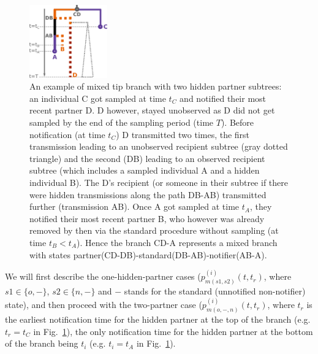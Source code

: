 \documentclass[a4paper,10pt]{article}
\begin{document}
\begin{figure}[tbhp]
\centering 
\includegraphics[width=0.3\textwidth]{Fig_mixed}
\caption{An example of mixed tip branch with two hidden partner subtrees: an individual C got sampled at time $t_C$ and notified their most recent partner D. D however, stayed unobserved as D did not get sampled by the end of the sampling period (time $T$). Before notification (at time $t_C$) D transmitted two times, the first transmission leading to an unobserved recipient subtree (gray dotted triangle) and the second (DB) leading to an observed recipient subtree (which includes a sampled individual A and a hidden individual B). The D's recipient (or someone in their subtree if there were hidden transmissions along the path DB-AB) transmitted further (transmission AB). Once A got sampled at time $t_A$, they notified their most recent partner B, who however was already removed by then via the standard procedure without sampling (at time $t_B < t_A$). Hence the branch CD-A represents a mixed branch with states partner(CD-DB)-standard(DB-AB)-notifier(AB-A). }
\label{fig:pn-mixed} 
\end{figure}


We will first describe the one-hidden-partner cases ($p_{m(s1,s2)}^{(i)}(t,t_r)$, where $s1 \in \{o, -\}$, $s2 \in \{n, -\}$ and $-$ stands for the standard (unnotified non-notifier) state), and then proceed with the two-partner case ($p_{m(o,-,n)}^{(i)}(t,t_{r})$, where $t_{r}$ is the earliest notification time for the hidden partner at the top of the branch (e.g. $t_r=t_C$ in Fig.~\ref{fig:pn-mixed}), the only notification time for the hidden partner at the bottom of the branch being $t_i$  (e.g. $t_i=t_A$ in Fig.~\ref{fig:pn-mixed}).
\end{document}
